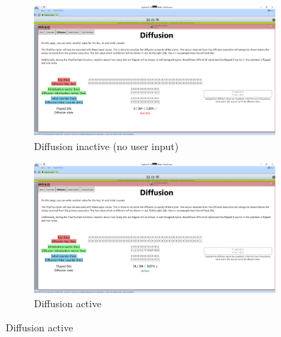 \begin{figure}
\caption{Diffusion page}
\label{fig:diffusion}
\centering
\begin{subfigure}{0.5\textwidth}
  \centering
  \includegraphics[width=0.99\textwidth]{figures/ct2/diffusion/diffusion-inactive.png}
  \caption{Diffusion inactive (no user input)}
  \label{fig:diffusion.inactive}
\end{subfigure}%
\begin{subfigure}{0.5\textwidth}
  \centering
  \includegraphics[width=0.99\textwidth]{figures/ct2/diffusion/diffusion-active.png}
  \caption{Diffusion active}
  \label{fig:diffusion.active}
\end{subfigure}


\end{figure}
